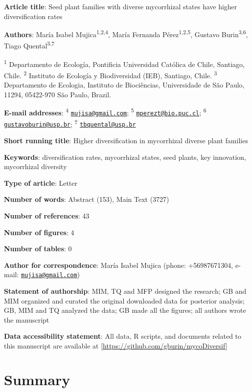 \documentclass[12pt,]{article}
\title{}
\author{}
\date{}
\begin{document}
\textbf{Article title}: Seed plant families with diverse mycorrhizal
states have higher diversification rates

\textbf{Authors}: María Isabel Mujica\textsuperscript{1,2,4}, María
Fernanda Pérez\textsuperscript{1,2,5}, Gustavo
Burin\textsuperscript{3,6}, Tiago Quental\textsuperscript{3,7}

\textsuperscript{1} Departamento de Ecología, Pontificia Universidad
Católica de Chile, Santiago, Chile. \textsuperscript{2} Instituto de
Ecología y Biodiversidad (IEB), Santiago, Chile. \textsuperscript{3}
Departamento de Ecologia, Instituto de Biociências, Universidade de São
Paulo, 11294, 05422-970 São Paulo, Brazil.

\textbf{E-mail addresses}: \textsuperscript{4}
\href{mailto:mujisa@gmail.com}{\nolinkurl{mujisa@gmail.com}};
\textsuperscript{5}
\href{mailto:mperezt@bio.puc.cl}{\nolinkurl{mperezt@bio.puc.cl}};
\textsuperscript{6}
\href{mailto:gustavoburin@usp.br}{\nolinkurl{gustavoburin@usp.br}};
\textsuperscript{7}
\href{mailto:tbquental@usp.br}{\nolinkurl{tbquental@usp.br}}

\textbf{Short running title}: Higher diversification in mycorrhizal
diverse plant families

\textbf{Keywords}: diversification rates, mycorrhizal states, seed
plants, key innovation, mycorrhizal diversity

\textbf{Type of article}: Letter

\textbf{Number of words}: Abstract (153), Main Text (3727)

\textbf{Number of references}: 43

\textbf{Number of figures}: 4

\textbf{Number of tables}: 0

\textbf{Author for correspondence}: María Isabel Mujica (phone:
+56987671304, e-mail:
\href{mailto:mujisa@gmail.com}{\nolinkurl{mujisa@gmail.com}})

\textbf{Statement of authorship}: MIM, TQ and MFP designed the research;
GB and MIM organized and curated the original downloaded data for
posterior analysis; GB, MIM and TQ analyzed the data; GB made all the
figures; all authors wrote the manuscript

\textbf{Data accessibility statement}: All data, R scripts, and
documents related to this manuscript are available at
{[}\url{https://github.com/gburin/mycoDiversif}{]}

\pagebreak

\hypertarget{summary}{%
\section{Summary}\label{summary}}
\end{document}

